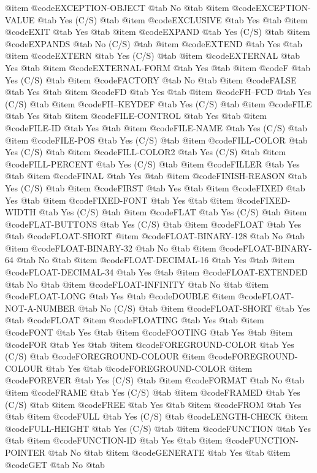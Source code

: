 @item @code{EXCEPTION-OBJECT} @tab No @tab 
@item @code{EXCEPTION-VALUE} @tab Yes	(C/S) @tab 
@item @code{EXCLUSIVE} @tab Yes @tab 
@item @code{EXIT} @tab Yes @tab 
@item @code{EXPAND} @tab Yes	(C/S) @tab 
@item @code{EXPANDS} @tab No	(C/S) @tab 
@item @code{EXTEND} @tab Yes @tab 
@item @code{EXTERN} @tab Yes	(C/S) @tab 
@item @code{EXTERNAL} @tab Yes @tab 
@item @code{EXTERNAL-FORM} @tab Yes @tab 
@item @code{F} @tab Yes	(C/S) @tab 
@item @code{FACTORY} @tab No @tab 
@item @code{FALSE} @tab Yes @tab 
@item @code{FD} @tab Yes @tab 
@item @code{FH--FCD} @tab Yes	(C/S) @tab 
@item @code{FH--KEYDEF} @tab Yes	(C/S) @tab 
@item @code{FILE} @tab Yes @tab 
@item @code{FILE-CONTROL} @tab Yes @tab 
@item @code{FILE-ID} @tab Yes @tab 
@item @code{FILE-NAME} @tab Yes	(C/S) @tab 
@item @code{FILE-POS} @tab Yes	(C/S) @tab 
@item @code{FILL-COLOR} @tab Yes	(C/S) @tab 
@item @code{FILL-COLOR2} @tab Yes	(C/S) @tab 
@item @code{FILL-PERCENT} @tab Yes	(C/S) @tab 
@item @code{FILLER} @tab Yes @tab 
@item @code{FINAL} @tab Yes @tab 
@item @code{FINISH-REASON} @tab Yes	(C/S) @tab 
@item @code{FIRST} @tab Yes @tab 
@item @code{FIXED} @tab Yes @tab 
@item @code{FIXED-FONT} @tab Yes @tab 
@item @code{FIXED-WIDTH} @tab Yes	(C/S) @tab 
@item @code{FLAT} @tab Yes	(C/S) @tab 
@item @code{FLAT-BUTTONS} @tab Yes	(C/S) @tab 
@item @code{FLOAT} @tab Yes @tab @code{FLOAT-SHORT}
@item @code{FLOAT-BINARY-128} @tab No @tab 
@item @code{FLOAT-BINARY-32} @tab No @tab 
@item @code{FLOAT-BINARY-64} @tab No @tab 
@item @code{FLOAT-DECIMAL-16} @tab Yes @tab 
@item @code{FLOAT-DECIMAL-34} @tab Yes @tab 
@item @code{FLOAT-EXTENDED} @tab No @tab 
@item @code{FLOAT-INFINITY} @tab No @tab 
@item @code{FLOAT-LONG} @tab Yes @tab @code{DOUBLE}
@item @code{FLOAT-NOT-A-NUMBER} @tab No	(C/S) @tab 
@item @code{FLOAT-SHORT} @tab Yes @tab @code{FLOAT}
@item @code{FLOATING} @tab Yes @tab 
@item @code{FONT} @tab Yes @tab 
@item @code{FOOTING} @tab Yes @tab 
@item @code{FOR} @tab Yes @tab 
@item @code{FOREGROUND-COLOR} @tab Yes	(C/S) @tab @code{FOREGROUND-COLOUR}
@item @code{FOREGROUND-COLOUR} @tab Yes @tab @code{FOREGROUND-COLOR}
@item @code{FOREVER} @tab Yes	(C/S) @tab 
@item @code{FORMAT} @tab No @tab 
@item @code{FRAME} @tab Yes	(C/S) @tab 
@item @code{FRAMED} @tab Yes	(C/S) @tab 
@item @code{FREE} @tab Yes @tab 
@item @code{FROM} @tab Yes @tab 
@item @code{FULL} @tab Yes	(C/S) @tab @code{LENGTH-CHECK}
@item @code{FULL-HEIGHT} @tab Yes	(C/S) @tab 
@item @code{FUNCTION} @tab Yes @tab 
@item @code{FUNCTION-ID} @tab Yes @tab 
@item @code{FUNCTION-POINTER} @tab No @tab 
@item @code{GENERATE} @tab Yes @tab 
@item @code{GET} @tab No @tab 
